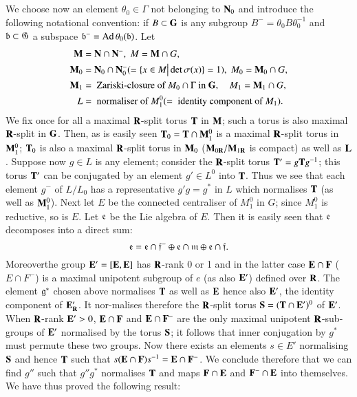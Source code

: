 \subsection{}\label{art9-subsec3.14}
We choose now an element $\theta_0 \in\Gamma$ not belonging to $\mathbf{N}_0$ and introduce the following notational convention: if $B \subset \mathbf{G}$ is any subgroup $B^- = \theta_0 B \theta^{-1}_0$ and $\mathfrak{b} \subset \mathfrak{G}$ a subspace $\mathfrak{b}^-= \operatorname{Ad} \theta_0 (\mathfrak{b})$. Let 
\begin{align*}
\mathbf{M} & = \mathbf{N} \cap \mathbf{N}^- , \; M =\mathbf{M} \cap G,\\
\mathbf{M}_0 & = \mathbf{N}_0 \cap \mathbf{N}_0^- (=\{x \in M \big| \det \sigma (x)\} =1) , \; M_0 = \mathbf{M}_0 \cap G,\\
\mathbf{M}_1 & = \text{ Zariski-closure of } M_0 \cap \Gamma \text{ in } \mathbf{G}, \quad  M_1 = \mathbf{M}_1 \cap G,\\
L & = \text{ normaliser of } M^0_1 (= \text{ identity component of } M_1).
\end{align*}
We fix once for all a maximal $\mathbf{R}$-split torus $\mathbf{T}$ in $\mathbf{M}$; such a torus is also maximal $\mathbf{R}$-split in $\mathbf{G}$. Then, as is easily seen $\mathbf{T}_0= \mathbf{T} \cap \mathbf{M}^0_1$ is a maximal $\mathbf{R}$-split torus in $\mathbf{M}^0_1$; $\mathbf{T}_0$ is also a maximal $\mathbf{R}$-split torus in $\mathbf{M}_0$ ($\mathbf{M}_{0\mathbf{R}}/ \mathbf{M}_{1\mathbf{R}}$ is compact) as well as $\mathbf{L}$. Suppose now $g \in L$ is any element; consider the $\mathbf{R}$-split torus $\mathbf{T}' = g \mathbf{T} g^{-1}$; this torus $\mathbf{T}'$ can be conjugated by an element $g' \in L^0$ into $\mathbf{T}$. Thus we see that each element $g^-$ of $L/L_0$ has a representative $g' g =g^\ast$ in $L$ which normalises $\mathbf{T}$ (as well as $\mathbf{M}^0_1$). Next let $E$ be the connected centraliser of $M^0_1$ in $G$; since $M^0_1$ is reductive, so is $E$. Let $\mathfrak{e}$ be the Lie algebra of $E$. Then it is easily seen that $\mathfrak{e}$ decomposes into a direct sum:
$$
\mathfrak{e} = \mathfrak{e} \cap \mathfrak{f}^{-} \oplus \mathfrak{e} \cap \mathfrak{m} \oplus \mathfrak{e} \cap \mathfrak{f}.
$$
Moreover\pageoriginale the group $\mathbf{E}'= [\mathbf{E}, \mathbf{E}]$ has $\mathbf{R}$-rank 0 or 1 and in the latter case $\mathbf{E} \cap \mathbf{F}$ (\resp $E \cap F^-$) is a maximal unipotent subgroup of $e$ (as also $\mathbf{E}'$) defined over $\mathbf{R}$. The element $\mathfrak{g}^\ast$ chosen above normalises $\mathbf{T}$ as well as $\mathbf{E}$ hence also $\mathbf{E}'$, the identity component of $\mathbf{E}'_{\mathbf{R}}$. It nor-malises therefore the $\mathbf{R}$-split torus $\mathbf{S} = (\mathbf{T} \cap \mathbf{E}')^0$ of $\mathbf{E}'$. When $\mathbf{R}$-rank $\mathbf{E}' > 0$, $\mathbf{E} \cap \mathbf{F}$ and $\mathbf{E} \cap \mathbf{F}^-$ are the only maximal unipotent $\mathbf{R}$-sub-groups of $\mathbf{E}'$ normalised by the torus $\mathbf{S}$; it follows that inner conjugation by $g^\ast$ must permute these two groups. Now there exists an elements $s \in E'$ normalising $\mathbf{S}$ and hence $\mathbf{T}$ such that $s(\mathbf{E} \cap \mathbf{F}) s^{-1} = \mathbf{E} \cap \mathbf{F}^-$. We  conclude therefore that we can find $g''$ such that $g'' g^\ast$ normalises $\mathbf{T}$ and maps $\mathbf{F} \cap \mathbf{E}$ and $\mathbf{F}^- \cap \mathbf{E}$ into themselves. We have thus proved the following result:

